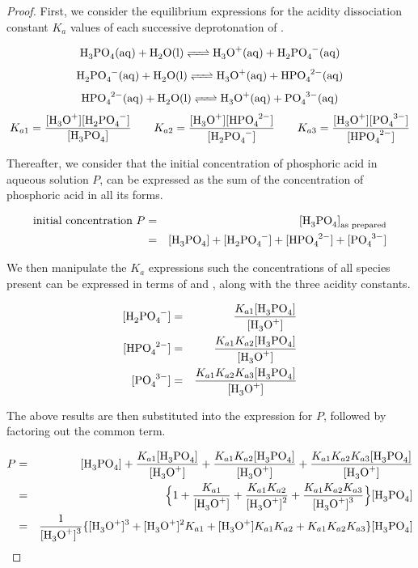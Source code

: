 \documentclass[a4paper,12pt,twocolumn]{article}
\begin{document}
	\begin{proof} First, we consider the equilibrium expressions for the acidity dissociation constant $K_a$ values of each successive deprotonation of .

		\begin{equation*}
 		\ce{H3PO4(aq) + H2O(l) <=> H3O+(aq) + H2PO4^-(aq)}
 		\end{equation*}
 		\begin{equation*}
 		\ce{H2PO4^-(aq) + H2O(l) <=> H3O+(aq) + HPO4^{2-}(aq)}
 		\end{equation*}
 		\begin{equation*}
 		\ce{HPO4^{2-}(aq) + H2O(l) <=> H3O+(aq) + PO4^{3-}(aq)}
 		\end{equation*}
 		\begin{equation*}
 		K_{a1}=\frac{\ce{[H3O+][H2PO4^-]}}{\ce{[H3PO4]}} \qquad K_{a2}=\frac{\ce{[H3O+][HPO4^{2-}]}}{\ce{[H2PO4^-]}}
 		\qquad K_{a3}=\frac{\ce{[H3O+][PO4^{3-}]}}{\ce{[HPO4^{2-}]}}
 		\end{equation*}

 	Thereafter, we consider that the initial concentration of phosphoric acid in aqueous solution $P$, can be expressed as
 	the sum of the concentration of phosphoric acid in all its forms.

 		\begin{eqnarray}
 		\text{initial concentration } P & = & \ce{[H3PO4]}_\text{as prepared} \nonumber \\
 		& = & \ce{[H3PO4] + [H2PO4^-] + [HPO4^{2-}] + [PO4^{3-}]} \nonumber
 		\end{eqnarray}

 	We then manipulate the $K_a$ expressions such the concentrations of all species present can be expressed in terms of \ce{[H_3PO_4]} and \ce{[H3O+]}, along with the three acidity constants.

 	\begin{eqnarray}
 		\ce{[H2PO4^{-}]} & = & \frac{K_{a1}\ce{[H3PO4]}}{\ce{[H3O+]}} \nonumber \\
 		\ce{[HPO4^{2-}]} & = & \frac{K_{a1}K_{a2}\ce{[H3PO4]}}{\ce{[H3O+]}} \nonumber \\
 		\ce{[PO4^{3-}]} & = & \frac{K_{a1}K_{a2}K_{a3}\ce{[H3PO4]}}{\ce{[H3O+]}} \nonumber
 		\end{eqnarray}

 	The above results are then substituted into the expression for $P$, followed by factoring out the common \ce{[H_3PO_4]} term.

 	\begin{eqnarray}
 		P & = & \ce{[H_3PO_4]} + \frac{K_{a1}\ce{[H3PO4]}}{\ce{[H3O+]}} + \frac{K_{a1}K_{a2}\ce{[H3PO4]}}{\ce{[H3O+]}} + \frac{K_{a1}K_{a2}K_{a3}\ce{[H3PO4]}}{\ce{[H3O+]}}  \nonumber \\
 		& = & \Big\{ 1 + \frac{K_{a1}}{\ce{[H3O+]}} + \frac{K_{a1}K_{a2}}{\ce{[H3O+]^2}} + \frac{K_{a1}K_{a2}K_{a3}}{\ce{[H3O+]^3}} \Big\}\ce{[H3PO4]} \nonumber \\
 		& = & \frac{1}{\ce{[H3O+]^3}} \{ \ce{[H3O+]^3} + \ce{[H3O+]^2}K_{a1} + \ce{[H3O+]}K_{a1}K_{a2} + K_{a1}K_{a2}K_{a3}\}\ce{[H3PO4]} \nonumber
 		\end{eqnarray}



\end{proof}
\end{document}
